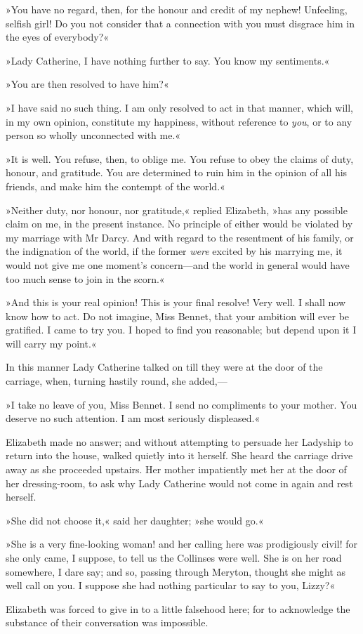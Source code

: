 »You have no regard, then, for the honour and credit of my nephew! Unfeeling, selfish girl! Do you not consider that a connection with you must disgrace him in the eyes of everybody?«

»Lady Catherine, I have nothing further to say. You know my sentiments.«

»You are then resolved to have him?«

»I have said no such thing. I am only resolved to act in that manner, which will, in my own opinion, constitute my happiness, without reference to \textit{you}, or to any person so wholly unconnected with me.«

»It is well. You refuse, then, to oblige me. You refuse to obey the claims of duty, honour, and gratitude. You are determined to ruin him in the opinion of all his friends, and make him the contempt of the world.«

»Neither duty, nor honour, nor gratitude,« replied Elizabeth, »has any possible claim on me, in the present instance. No principle of either would be violated by my marriage with Mr Darcy. And with regard to the resentment of his family, or the indignation of the world, if the former \textit{were} excited by his marrying me, it would not give me one moment's concern—and the world in general would have too much sense to join in the scorn.«

»And this is your real opinion! This is your final resolve! Very well. I shall now know how to act. Do not imagine, Miss Bennet, that your ambition will ever be gratified. I came to try you. I hoped to find you reasonable; but depend upon it I will carry my point.«

In this manner Lady Catherine talked on till they were at the door of the carriage, when, turning hastily round, she added,—

»I take no leave of you, Miss Bennet. I send no compliments to your mother. You deserve no such attention. I am most seriously displeased.«

Elizabeth made no answer; and without attempting to persuade her Ladyship to return into the house, walked quietly into it herself. She heard the carriage drive away as she proceeded upstairs. Her mother impatiently met her at the door of her dressing-room, to ask why Lady Catherine would not come in again and rest herself.

»She did not choose it,« said her daughter; »she would go.«

»She is a very fine-looking woman! and her calling here was prodigiously civil! for she only came, I suppose, to tell us the Collinses were well. She is on her road somewhere, I dare say; and so, passing through Meryton, thought she might as well call on you. I suppose she had nothing particular to say to you, Lizzy?«

Elizabeth was forced to give in to a little falsehood here; for to acknowledge the substance of their conversation was impossible.